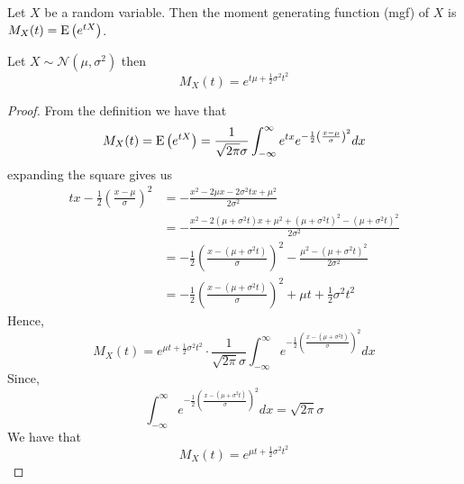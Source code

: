 \begin{definition}
	Let $X$ be a random variable. Then the moment generating function (mgf) of $X$ is $M_X(t) = \expected[e^{tX}]$.
\end{definition}
\begin{theorem}
	Let $X\sim \mathcal{N}(\mu,\sigma^2)$ then
	$$
	M_X(t) = e^{t\mu + \frac{1}{2}\sigma^2t^2}
	$$
	\begin{proof}
		From the definition we have that
		$$
		M_X(t) = \expected[e^{tX}] = \frac{1}{\sqrt{2\pi}\sigma}\int_{-\infty}^\infty e^{tx}e^{-\frac{1}{2}\left(\frac{x - \mu}{\sigma}\right)^2}dx
		$$
		expanding the square gives us
		\begin{align*}
		tx - \frac{1}{2}\left(\frac{x - \mu}{\sigma}\right)^2 &= -\frac{x^2 - 2\mu x - 2\sigma^2tx + \mu^2}{2\sigma^2}\\
		&= - \frac{x^2 - 2(\mu + \sigma^2t)x + \mu^2 + (\mu + \sigma^2t)^2 - (\mu + \sigma^2t)^2}{2\sigma^2}\\
		&= - \frac{1}{2}\left(\frac{x - (\mu + \sigma^2t)}{\sigma}\right)^2 - \frac{\mu^2 - (\mu + \sigma^2t)^2}{2\sigma^2}\\
		&= - \frac{1}{2}\left(\frac{x - (\mu + \sigma^2t)}{\sigma}\right)^2 + \mu t + \frac{1}{2}\sigma^2 t^2
		\end{align*}
		Hence,
		$$
		M_X(t) = e^{\mu t + \frac{1}{2}\sigma^2 t^2}\cdot \frac{1}{\sqrt{2\pi}\sigma}\int_{-\infty}^{\infty}e^{- \frac{1}{2}\left(\frac{x - (\mu + \sigma^2t)}{\sigma}\right)^2} dx
		$$
		Since,
		$$
		\int_{-\infty}^{\infty}e^{- \frac{1}{2}\left(\frac{x - (\mu + \sigma^2t)}{\sigma}\right)^2} dx = \sqrt{2\pi}\sigma
		$$
		We have that
		$$
		M_X(t) = e^{\mu t + \frac{1}{2}\sigma^2 t^2}
		$$
	\end{proof}
\end{theorem}
